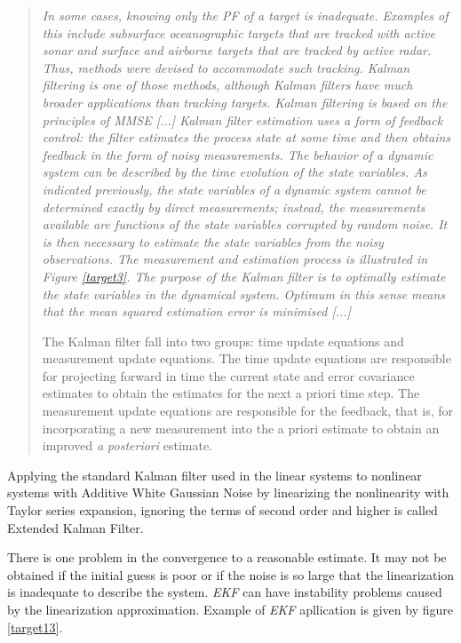 \documentclass[english,purist]{ist-report}
\begin{document}
\begin{quote} \itshape
In some cases, knowing only the PF of a target is inadequate. Examples of this include subsurface oceanographic targets that are tracked with active sonar and surface and airborne targets that are tracked by active radar. Thus, methods were devised to accommodate such tracking. Kalman filtering is one of those methods, although Kalman filters have much broader applications than tracking targets.
Kalman filtering is based on the principles of MMSE [...]
 Kalman filter estimation uses a form of feedback control: the filter estimates the process state at some time and then obtains feedback in the form of noisy measurements. The behavior of a dynamic system can be described by the time evolution of the state variables. As indicated previously, the state variables of a dynamic system cannot be determined exactly by direct measurements; instead, the measurements available are functions of the state variables corrupted by random noise. It is then necessary to estimate the state variables from the noisy observations. The measurement and estimation process is illustrated in Figure \ref{target3}. The purpose of the Kalman filter is to optimally estimate the state variables in the dynamical system. Optimum in this sense means that the mean squared estimation error is minimised [...]

 The Kalman filter fall into two groups: time update equations and measurement update equations. The time update equations are responsible for projecting forward in time the current state and error covariance estimates to obtain the estimates for the next a priori time step. The measurement update equations are responsible for the feedback, that is, for incorporating a new measurement into the a priori estimate to obtain an improved \textit{a posteriori} estimate. \cite{poiseltarget}\end{quote}

Applying the standard Kalman filter used in the linear systems to nonlinear systems with Additive White Gaussian Noise by linearizing the nonlinearity with Taylor series expansion, ignoring the terms of second order and higher is called Extended Kalman Filter.  

There is one problem in the convergence to a reasonable estimate. It may not be obtained if the initial guess is poor or if the noise is so large that the linearization is inadequate to describe the system. \textit{EKF} can have instability problems caused by the linearization approximation. Example of \textit{EKF} apllication is given by figure \ref{target13}.  
\end{document}
